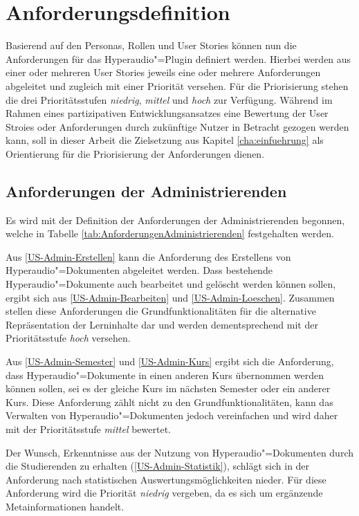 \section{Anforderungsdefinition}
\label{sec:anforderungsdefinition}
Basierend auf den Personas, Rollen und User Stories können nun die Anforderungen für das Hyperaudio"=Plugin definiert werden. Hierbei werden aus einer oder mehreren User Stories jeweils eine oder mehrere Anforderungen abgeleitet und zugleich mit einer Priorität versehen. Für die Priorisierung stehen die drei Prioritätsstufen \textit{niedrig}, \textit{mittel} und \textit{hoch} zur Verfügung. Während im Rahmen eines partizipativen Entwicklungsansatzes eine Bewertung der User Stroies oder Anforderungen durch zukünftige Nutzer in Betracht gezogen werden kann, soll in dieser Arbeit die Zielsetzung aus Kapitel \ref{cha:einfuehrung} als Orientierung für die Priorisierung der Anforderungen dienen.

\subsection{Anforderungen der Administrierenden}
\label{sub:AnforderungenDerAdministrierenden}
Es wird mit der Definition der Anforderungen der Administrierenden begonnen, welche in Tabelle \ref{tab:AnforderungenAdministrierenden} festgehalten werden. 

Aus \ref{US-Admin-Erstellen} kann die Anforderung des Erstellens von Hyperaudio"=Dokumenten abgeleitet werden. Dass bestehende Hyperaudio"=Dokumente auch bearbeitet und gelöscht werden können sollen, ergibt sich aus \ref{US-Admin-Bearbeiten} und \ref{US-Admin-Loeschen}. Zusammen stellen diese Anforderungen die Grundfunktionalitäten für die alternative Repräsentation der Lerninhalte dar und werden dementsprechend mit der Prioritätsstufe \textit{hoch} versehen.

Aus \ref{US-Admin-Semester} und \ref{US-Admin-Kurs} ergibt sich die Anforderung, dass Hyperaudio"=Dokumente in einen anderen Kurs übernommen werden können sollen, sei es der gleiche Kurs im nächsten Semester oder ein anderer Kurs. Diese Anforderung zählt nicht zu den Grundfunktionalitäten, kann das Verwalten von Hyperaudio"=Dokumenten jedoch vereinfachen und wird daher mit der Prioritätsstufe \textit{mittel} bewertet.

Der Wunsch, Erkenntnisse aus der Nutzung von Hyperaudio"=Dokumenten durch die Studierenden zu erhalten (\ref{US-Admin-Statistik}), schlägt sich in der Anforderung nach statistischen Auswertungsmöglichkeiten nieder. Für diese Anforderung wird die Priorität \textit{niedrig} vergeben, da es sich um ergänzende Metainformationen handelt.


